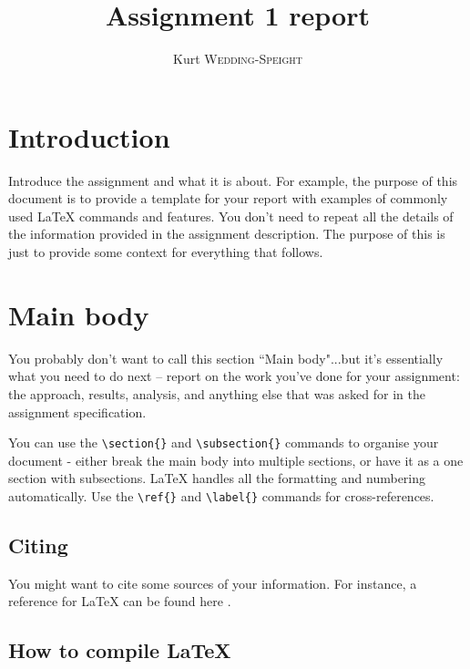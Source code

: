 \documentclass[12pt]{article}
\title{Assignment 1 report}
\author{Kurt \textsc{Wedding-Speight}}
\begin{document}
\maketitle


\section{Introduction}

Introduce the assignment and what it is about.  For example, the purpose of this document is to provide a template for your report with examples of commonly used \LaTeX{} commands and features.  You don't need to repeat all the details of the information provided in the assignment description.  The purpose of this is just to provide some context for everything that follows.   

\section{Main body}

You probably don't want to call this section ``Main body"...but it's essentially what you need to do next --  report on the work you've done for your assignment: the approach, results, analysis, and anything else that was asked for in the assignment specification.  

You can use the \verb$\section{}$ and \verb$\subsection{}$ commands to organise your document - either break the main body into multiple sections, or have it as a one section with subsections.   \LaTeX{} handles all the formatting and numbering automatically. Use the \verb$\ref{}$ and \verb$\label{}$ commands for cross-references.  

\subsection{Citing}

You might want to cite some sources of your information.  For instance, a reference for \LaTeX{} can be found here \cite{latexcompanion}.

\subsection{How to compile \LaTeX{}}
\end{document}
